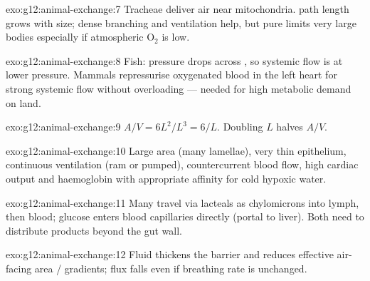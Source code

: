 \begin{solution}{exo:g12:animal-exchange:7}
Tracheae deliver air near mitochondria.  path length grows with
size; dense branching and ventilation help, but pure  limits
very large bodies especially if atmospheric O$_2$ is low.
\end{solution}

\begin{solution}{exo:g12:animal-exchange:8}
Fish: pressure drops across , so systemic flow is at lower
pressure. Mammals repressurise oxygenated blood in the left heart for
strong systemic flow without overloading  --- needed for high
metabolic demand on land.
\end{solution}

\begin{solution}{exo:g12:animal-exchange:9}
$A/V = 6L^2/L^3 = 6/L$. Doubling $L$ halves $A/V$.
\end{solution}

\begin{solution}{exo:g12:animal-exchange:10}
Large  area (many lamellae), very thin epithelium, continuous
ventilation (ram or pumped), countercurrent blood flow, high cardiac
output and haemoglobin with appropriate affinity for cold hypoxic water.
\end{solution}

\begin{solution}{exo:g12:animal-exchange:11}
Many  travel via lacteals as chylomicrons into lymph, then blood;
glucose enters blood capillaries directly (portal to liver). Both need
 to distribute products beyond the gut wall.
\end{solution}

\begin{solution}{exo:g12:animal-exchange:12}
Fluid thickens the  barrier and reduces effective air-facing
area / gradients; flux falls even if breathing rate is unchanged.
\end{solution}

